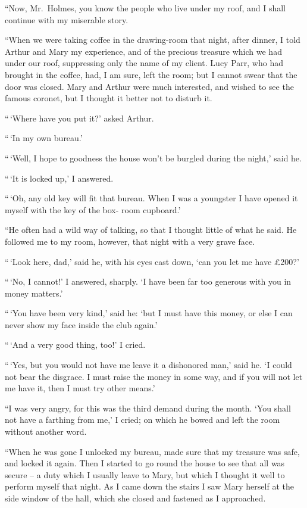 “Now, Mr.~Holmes, you know the people who live under
my roof, and I shall continue with my miserable story.

“When we were taking coffee in the drawing-room that
night, after dinner, I told Arthur and Mary my experience,
and of the precious treasure which we had under our roof,
suppressing only the name of my client. Lucy Parr, who had
brought in the coffee, had, I am sure, left the room; but I
cannot swear that the door was closed. Mary and Arthur
were much interested, and wished to see the famous coronet,
but I thought it better not to disturb it.

“\,‘Where have you put it?’ asked Arthur.

“\,‘In my own bureau.’

“\,‘Well, I hope to goodness the house won’t be burgled
during the night,’ said he.

“\,‘It is locked up,’ I answered.

“\,‘Oh, any old key will fit that bureau. When I was a
youngster I have opened it myself with the key of the box-%
room cupboard.’

“He often had a wild way of talking, so that I thought little
of what he said. He followed me to my room, however, that
night with a very grave face.

“\,‘Look here, dad,’ said he, with his eyes cast down, ‘can
you let me have £200?’

“\,‘No, I cannot!’ I answered, sharply. ‘I have been far
too generous with you in money matters.’

“\,‘You have been very kind,’ said he: ‘but I must have
this money, or else I can never show my face inside the club
again.’

“\,‘And a very good thing, too!’ I cried.

“\,‘Yes, but you would not have me leave it a dishonored
man,’ said he. ‘I could not bear the disgrace. I must raise
the money in some way, and if you will not let me have it,
then I must try other means.’

“I was very angry, for this was the third demand during
the month. ‘You shall not have a farthing from me,’ I cried;
on which he bowed and left the room without another word.

“When he was gone I unlocked my bureau, made sure that
my treasure was safe, and locked it again. Then I started to
go round the house to see that all was secure -- a duty which
I usually leave to Mary, but which I thought it well to perform
myself that night. As I came down the stairs I saw
Mary herself at the side window of the hall, which she closed
and fastened as I approached.

